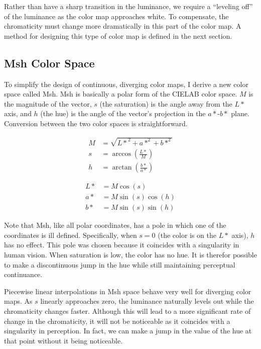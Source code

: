 \documentclass[twocolumn]{article}
\newcommand{\Lab}{CIELAB\xspace}
\newcommand{\Msh}{Msh\xspace}
\begin{document}
Rather than have a sharp transition in the luminance, we require a
``leveling off'' of the luminance as the color map approaches white.  To
compensate, the chromaticity must change more dramatically in this part of
the color map.  A method for designing this type of color map is defined in
the next section.

\subsection{\Msh Color Space}
\label{sec:MshColorSpace}

To simplify the design of continuous, diverging color maps, I derive a new
color space called \Msh.  \Msh is basically a polar form of the \Lab color
space.  $M$ is the magnitude of the vector, $s$ (the saturation) is the
angle away from the $L*$ axis, and $h$ (the hue) is the angle of the
vector's projection in the $a*$-$b*$ plane.  Conversion between the two
color spaces is straightforward.

\begin{equation}
  \begin{split}
    M &= \sqrt{{L*}^2 + a*^2 + b*^2} \\
    s &= \arccos\left(\frac{L*}{M}\right) \\
    h &= \arctan\left(\frac{b*}{a*}\right)
  \end{split}
  \label{eqn:LabToMsh}
\end{equation}

\begin{equation}
  \begin{split}
    L* &= M \cos\left(s\right) \\
    a* &= M \sin\left(s\right) \cos\left(h\right) \\
    b* &= M \sin\left(s\right) \sin\left(h\right)
  \end{split}
\end{equation}

Note that \Msh, like all polar coordinates, has a pole in which one of the
coordinates is ill defined.  Specifically, when $s = 0$ (the color is on
the $L*$ axis), $h$ has no effect.  This pole was chosen because it
coincides with a singularity in human vision.  When saturation is low, the
color has no hue.  It is therefor possible to make a discontinuous jump
in the hue while still maintaining perceptual continuance.

Piecewise linear interpolations in \Msh space behave very well for
diverging color maps.  As $s$ linearly approaches zero, the luminance
naturally levels out while the chromaticity changes faster.  Although this
will lead to a more significant rate of change in the chromaticity, it will
not be noticeable as it coincides with a singularity in perception.  In
fact, we can make a jump in the value of the hue at that point without it
being noticeable.
\end{document}

